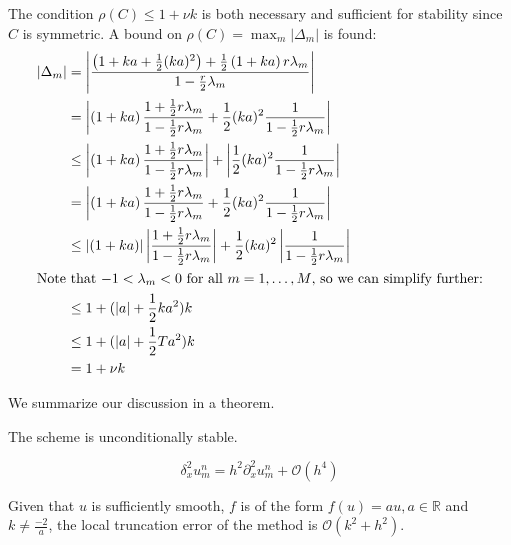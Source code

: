 The condition \( \rho(C) \le 1 + \nu k \) is
both necessary and sufficient for stability since \( C \) is symmetric.
A bound on \( \rho(C) = \max_{m} \lvert \Delta_m \rvert \) is found:
\begin{align}
  \left\lvert \Delta_m \right\rvert &= 
\left\lvert \frac{\left(1+ka+\frac{1}{2}(ka)^2\right) + \frac{1}{2}\left(1+ka\right)r \lambda_m}
{1 - \frac{r}{2} \lambda_m} \right\rvert \\
 &= 
 \left\lvert \left(1+ka\right)\frac{1+\frac{1}{2}r \lambda_m}{1 - \frac{1}{2}r \lambda_m} + \frac{1}{2}(ka)^2 \frac{1}{1 - \frac{1}{2}r \lambda_m} \right\rvert \\
 &\le \left\lvert \left(1+ka\right)\frac{1+\frac{1}{2}r \lambda_m}{1 - \frac{1}{2}r \lambda_m} \right\rvert + \left\lvert\frac{1}{2}(ka)^2 \frac{1}{1 - \frac{1}{2}r \lambda_m} \right\rvert \\
 &= 
 \left\lvert \left(1+ka\right)\frac{1+\frac{1}{2}r \lambda_m}{1 - \frac{1}{2}r \lambda_m} + \frac{1}{2}(ka)^2 \frac{1}{1 - \frac{1}{2}r \lambda_m} \right\rvert \\
 &\le \left\lvert \left(1+ka\right) \right\rvert \left\lvert \frac{1+\frac{1}{2}r \lambda_m}{1 - \frac{1}{2}r \lambda_m} \right\rvert + \frac{1}{2}(ka)^2 \left\lvert\frac{1}{1 - \frac{1}{2}r \lambda_m} \right\rvert \\
 \intertext{Note that \( -1 < \lambda_m < 0  \) for all \( m = 1, \dots, M \), so we can simplify further:}
 &\le 1 + (\lvert a \rvert + \frac{1}{2}k a^2 )k \\
 &\le 1 + (\lvert a \rvert + \frac{1}{2}T a^2)k \\
 &= 1 + \nu k
\end{align}

We summarize our discussion in a theorem.

\begin{theorem}
    The scheme is unconditionally stable.
\end{theorem}

\begin{lemma}
    \label{central_difference}
    $$\delta_x^2u_{m}^{n} = h^2\partial_x^2 u_{m}^{n} + \mathcal{O}(h^4)$$
\end{lemma}


\begin{theorem}
    \label{consistent}
    Given that $u$ is sufficiently smooth,  $f$ is of the form $f(u)=au, a\in \mathbb{R}$ and $k \neq \frac{-2}{a}$, the local truncation error of the method is $\mathcal{O}(k^2 + h^2).$
\end{theorem}


